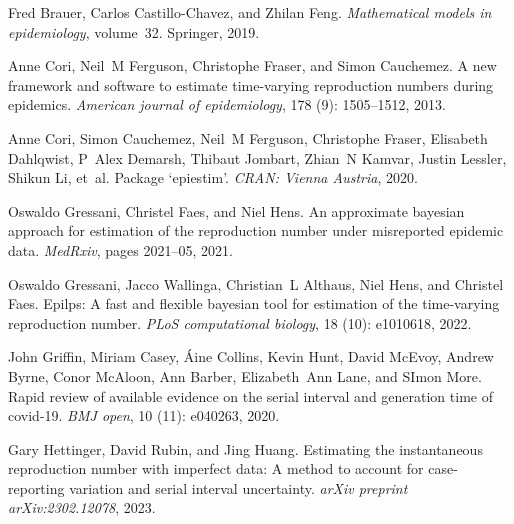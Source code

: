\documentclass[10pt,letterpaper]{article}
\begin{document}
\begin{thebibliography}{32}
  Fred Brauer, Carlos Castillo-Chavez, and Zhilan Feng.
  \newblock \emph{Mathematical models in epidemiology}, volume~32.
  \newblock Springer, 2019.
  
  Anne Cori, Neil~M Ferguson, Christophe Fraser, and Simon Cauchemez.
  \newblock A new framework and software to estimate time-varying reproduction
    numbers during epidemics.
  \newblock \emph{American journal of epidemiology}, 178 (9):
    1505--1512, 2013.
  
  Anne Cori, Simon Cauchemez, Neil~M Ferguson, Christophe Fraser, Elisabeth
    Dahlqwist, P~Alex Demarsh, Thibaut Jombart, Zhian~N Kamvar, Justin Lessler,
    Shikun Li, et~al.
  \newblock Package `epiestim'.
  \newblock \emph{CRAN: Vienna Austria}, 2020.
  
  Oswaldo Gressani, Christel Faes, and Niel Hens.
  \newblock An approximate bayesian approach for estimation of the reproduction
    number under misreported epidemic data.
  \newblock \emph{MedRxiv}, pages 2021--05, 2021.
  
  Oswaldo Gressani, Jacco Wallinga, Christian~L Althaus, Niel Hens, and Christel
    Faes.
  \newblock Epilps: A fast and flexible bayesian tool for estimation of the
    time-varying reproduction number.
  \newblock \emph{PLoS computational biology}, 18 (10):
    e1010618, 2022.
  
  John Griffin, Miriam Casey, {\'A}ine Collins, Kevin Hunt, David McEvoy, Andrew
    Byrne, Conor McAloon, Ann Barber, Elizabeth~Ann Lane, and SImon More.
  \newblock Rapid review of available evidence on the serial interval and
    generation time of covid-19.
  \newblock \emph{BMJ open}, 10 (11): e040263, 2020.
  
  Gary Hettinger, David Rubin, and Jing Huang.
  \newblock Estimating the instantaneous reproduction number with imperfect data:
    A method to account for case-reporting variation and serial interval
    uncertainty.
  \newblock \emph{arXiv preprint arXiv:2302.12078}, 2023.
  

\end{thebibliography}
\end{document}
